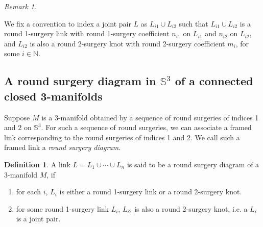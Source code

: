 \documentclass{amsart}
\theoremstyle{plain}
\theoremstyle{remark}
\newtheorem{rem}{Remark}
\theoremstyle{definition}
\newtheorem{defn}{Definition}
\newcommand{\s}{\mathbb{S}}
\begin{document}
\begin{rem}\label{rem: StdPos}

We fix a convention to index a joint pair $L$ as $L_{i1} \cup L_{i2}$ such that $L_{i1} \cup L_{i2}$ is a round 1-surgery link with round 1-surgery coefficient $n_{i1}$ on $L_{i1}$ and $n_{i2}$ on $L_{i2}$, and $L_{i2}$ is also a round 2-surgery knot with round 2-surgery coefficient $m_i$, for some $i\in \mathbb{N}$. 
\end{rem}

\subsection{A round surgery diagram in $\mathbb{S}^3$ of a connected closed 3-manifolds}


Suppose $M$ is a 3-manifold obtained by a sequence of round surgeries of indices 1 and 2 on $\s^3$.
For such a sequence of round surgeries, we can associate a framed link corresponding to the round surgeries of indices 1 and 2. We call such a framed link a {\it round surgery diagram}. 
\begin{defn}
    A link $L=L_1 \cup \cdots \cup L_{n}$ is said to be a round surgery diagram of a 3-manifold $M$, if 
    \begin{enumerate}
        \item for each $i$, $L_i$ is either a round 1-surgery link or a round 2-surgery knot. 
        \item for some round 1-surgery link $L_i$, $L_{i2}$ is also a round 2-surgery knot, i.e. a $L_i$ is a joint pair. 
    \end{enumerate}
\end{defn}
\end{document}
